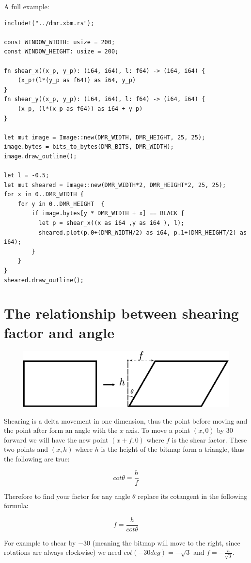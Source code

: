 \documentclass[12pt,openany,a4,usenames,dvipsnames]{book}
\newcommand\bitmap{{\pixelfont{}bitmap}}
\begin{document}
A full example:
\begin{verbatim}
include!("../dmr.xbm.rs");

const WINDOW_WIDTH: usize = 200;
const WINDOW_HEIGHT: usize = 200;

fn shear_x((x_p, y_p): (i64, i64), l: f64) -> (i64, i64) {
    (x_p+(l*(y_p as f64)) as i64, y_p)
}
fn shear_y((x_p, y_p): (i64, i64), l: f64) -> (i64, i64) {
    (x_p, (l*(x_p as f64)) as i64 + y_p)
}

let mut image = Image::new(DMR_WIDTH, DMR_HEIGHT, 25, 25);
image.bytes = bits_to_bytes(DMR_BITS, DMR_WIDTH);
image.draw_outline();

let l = -0.5;
let mut sheared = Image::new(DMR_WIDTH*2, DMR_HEIGHT*2, 25, 25);
for x in 0..DMR_WIDTH {
    for y in 0..DMR_HEIGHT  {
        if image.bytes[y * DMR_WIDTH + x] == BLACK {
          let p = shear_x((x as i64 ,y as i64 ), l);
          sheared.plot(p.0+(DMR_WIDTH/2) as i64, p.1+(DMR_HEIGHT/2) as i64); 
        }
    }
}
sheared.draw_outline();
\end{verbatim}
\section{The relationship between shearing factor and angle}
\begin{figure}[H]
\centering
\includegraphics[width=\textwidth,keepaspectratio]{figures/xshear.pdf}
\end{figure}
Shearing is a delta movement in one dimension, thus the point before moving and the point after form an angle with the $x$ axis. To move a point $(x, 0)$ by 30\textdegree{} forward we will have the new point $(x+f, 0)$ where $f$ is the shear factor. These two points and $(x, h)$ where $h$ is the height of the \bitmap{} form a triangle, thus the following are true:

$$cot\theta{} = \frac{h}{f}$$

Therefore to find your factor for any angle $\theta{}$ replace its cotangent in the following formula:

$$f = \frac{h}{cot\theta{}}$$

For example to shear by $-$30\textdegree{} (meaning the \bitmap{} will move to the right, since rotations are always clockwise) we need $cot(-30deg) = -\sqrt{3}$ and $f=-\frac{h}{\sqrt{3}}$.
\end{document}
